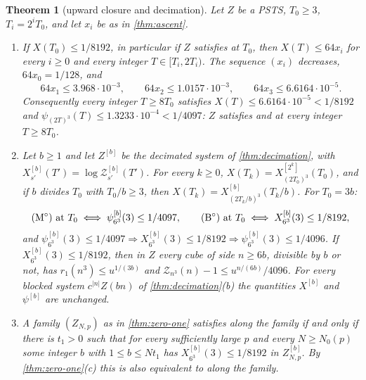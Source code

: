 \documentclass[11pt,a4paper]{amsart}
\newtheorem{theorem}{Theorem}[section]
\theoremstyle{definition}
\theoremstyle{remark}
\numberwithin{equation}{section}
\newcommand{\PSTS}{\textup{PSTS}}          %
\newcommand{\TT}{\mathbb{T}}               %
\newcommand{\Zc}{\mathcal{Z}}              %
\newcommand{\Zs}[2]{\Zc_{#1}(#2)}          %
\newcommand{\psiT}[2]{\psi_{#1}(#2)}       %
\newcommand{\cube}[1]{(2#1)^3}             %
\newcommand{\dconst}{\frac{1}{4097}}       %
\newcommand{\xconst}{\frac{1}{8192}}       %
\newcommand{\dconstinl}{1/4097}            %
\newcommand{\xconstinl}{1/8192}            %
\newcommand{\Mcirc}{\text{\upshape(M$^{\circ}$)}}   %
\newcommand{\Bcirc}{\text{\upshape(B$^{\circ}$)}}   %
\begin{document}
\begin{theorem}[upward closure and decimation]\label{thm:upward-closed}
Let $Z$ be a \PSTS{}, $T_0\ge3$, $T_i=2^iT_0$, and let $x_i$ be as in \cref{thm:ascent}.
\begin{enumerate}[label=(\alph*)]
\item If $X(T_0)\le\xconstinl$, in particular if $Z$ satisfies \Mcirc{} at $T_0$, then $X(T)\le64x_i$ for every $i\ge0$ and every integer $T\in[T_i,2T_i)$. The sequence $(x_i)$ decreases, $64x_0=1/128$, and
\[
64x_1\le3.968\cdot10^{-3},\qquad64x_2\le1.0157\cdot10^{-3},\qquad64x_3\le6.6164\cdot10^{-5}.
\]
Consequently every integer $T\ge8T_0$ satisfies $X(T)\le6.6164\cdot10^{-5}<\xconstinl$ and $\psiT{\cube{T}}{T}\le1.3233\cdot10^{-4}<\dconstinl$: $Z$ satisfies \Mcirc{} and \Bcirc{} at every integer $T\ge8T_0$.
\item Let $b\ge1$ and let $Z^{[b]}$ be the decimated system of \cref{thm:decimation}, with $X^{[b]}_{s'}(T')=\log\Zc^{[b]}_{s'}(T')$. For every $k\ge0$, $X(T_k)=X^{[2^k]}_{\cube{T_0}}(T_0)$, and if $b$ divides $T_0$ with $T_0/b\ge3$, then $X(T_k)=X^{[b]}_{(2T_k/b)^3}(T_k/b)$. For $T_0=3b$:
\[
\text{\Mcirc{} at }T_0\iff\psi^{[b]}_{6^3}(3)\le\dconstinl,\qquad\text{\Bcirc{} at }T_0\iff X^{[b]}_{6^3}(3)\le\xconstinl,
\]
and $\psi^{[b]}_{6^3}(3)\le\dconstinl\Rightarrow X^{[b]}_{6^3}(3)\le\xconstinl\Rightarrow\psi^{[b]}_{6^3}(3)\le1/4096$. If $X^{[b]}_{6^3}(3)\le\xconstinl$, then in $Z$ every cube of side $n\ge6b$, divisible by $b$ or not, has $r_1(n^3)\le u^{1/(3b)}$ and $\Zs{n^3}{n}-1\le u^{n/(6b)}/4096$. For every blocked system $c^{|n|}Z(bn)$ of \cref{thm:decimation}(b) the quantities $X^{[b]}$ and $\psi^{[b]}$ are unchanged.
\item A family $(Z_{N,p})$ as in \cref{thm:zero-one} satisfies \Bcirc{} along the family if and only if there is $t_1>0$ such that for every sufficiently large $p$ and every $N\ge N_0(p)$ some integer $b$ with $1\le b\le Nt_1$ has $X^{[b]}_{6^3}(3)\le\xconstinl$ in $Z_{N,p}^{[b]}$. By \cref{thm:zero-one}(c) this is also equivalent to \Mcirc{} along the family.
\end{enumerate}
\end{theorem}
\end{document}
